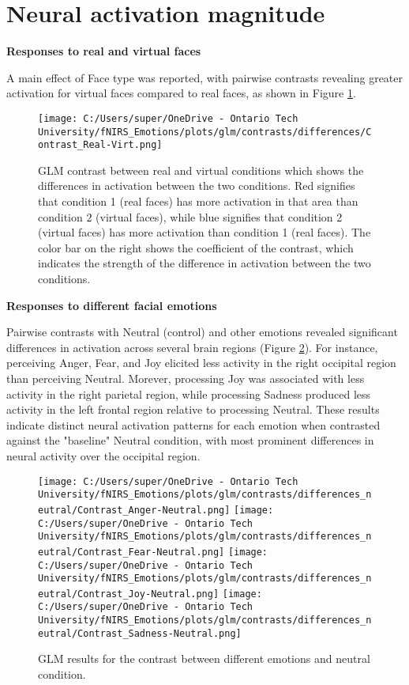 \section{Neural activation magnitude}
\noindent
\textbf{Responses to real and virtual faces}

A main effect of Face type was reported, with pairwise contrasts revealing greater activation for virtual faces compared to real faces, as shown in Figure \ref{fig:glm_real_vs_virtual}.
\begin{figure}[H]
    \centering
      \texttt{[image: C:/Users/super/OneDrive - Ontario Tech University/fNIRS\_Emotions/plots/glm/contrasts/differences/Contrast\_Real-Virt.png]}
      \caption[GLM: Real vs. Virtual Faces]{GLM contrast between real and virtual conditions which shows the differences in activation between the two conditions.
      Red signifies that condition 1 (real faces) has more activation in that area than condition 2 (virtual faces), while blue signifies that condition 2 (virtual faces) has more activation than condition 1 (real faces).
      The color bar on the right shows the coefficient of the contrast, which indicates the strength of the difference in activation between the two conditions.}
      \label{fig:glm_real_vs_virtual}
\end{figure}

\noindent
\textbf{Responses to different facial emotions}

Pairwise contrasts with Neutral (control) and other emotions revealed significant differences in activation across several brain regions (Figure \ref{fig:glm_emotion_analysis_neutral}). 
For instance, perceiving Anger, Fear, and Joy elicited less activity in the right occipital region than perceiving Neutral. 
Morever, processing Joy was associated with less activity in the right parietal region, while processing Sadness produced less activity in the left frontal region relative to processing Neutral. 
These results indicate distinct neural activation patterns for each emotion when contrasted against the "baseline" Neutral condition, with most prominent differences in neural activity over the occipital region. 

\begin{figure}[H]
    \centering
    \texttt{[image: C:/Users/super/OneDrive - Ontario Tech University/fNIRS\_Emotions/plots/glm/contrasts/differences\_neutral/Contrast\_Anger-Neutral.png]}
    \texttt{[image: C:/Users/super/OneDrive - Ontario Tech University/fNIRS\_Emotions/plots/glm/contrasts/differences\_neutral/Contrast\_Fear-Neutral.png]}
    \texttt{[image: C:/Users/super/OneDrive - Ontario Tech University/fNIRS\_Emotions/plots/glm/contrasts/differences\_neutral/Contrast\_Joy-Neutral.png]}
    \texttt{[image: C:/Users/super/OneDrive - Ontario Tech University/fNIRS\_Emotions/plots/glm/contrasts/differences\_neutral/Contrast\_Sadness-Neutral.png]}
    \caption[GLM: Emotion vs. Neutral]{GLM results for the contrast between different emotions and neutral condition.}
    \label{fig:glm_emotion_analysis_neutral}
\end{figure}

